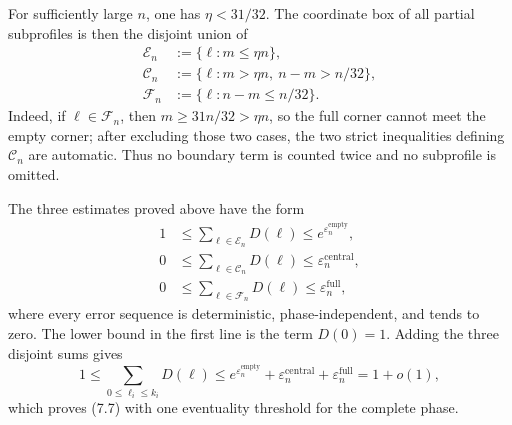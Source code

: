 
For sufficiently large $n$, one has $\eta<31/32$. The coordinate box of all
partial subprofiles is then the disjoint union of
\[
\begin{aligned}
  \mathcal E_n&:=\{\ell:m\le\eta n\},\\
  \mathcal C_n&:=\{\ell:m>\eta n,\ n-m>n/32\},\\
  \mathcal F_n&:=\{\ell:n-m\le n/32\}.
\end{aligned}
\]
Indeed, if $\ell\in\mathcal F_n$, then
$m\ge31n/32>\eta n$, so the full corner cannot meet the empty corner; after
excluding those two cases, the two strict inequalities defining
$\mathcal C_n$ are automatic. Thus no boundary term is counted twice and no
subprofile is omitted.

The three estimates proved above have the form
\[
\begin{aligned}
  1&\le\sum_{\ell\in\mathcal E_n}D(\ell)
      \le e^{\varepsilon_n^{\mathrm{empty}}},\\
  0&\le\sum_{\ell\in\mathcal C_n}D(\ell)
      \le\varepsilon_n^{\mathrm{central}},\\
  0&\le\sum_{\ell\in\mathcal F_n}D(\ell)
      \le\varepsilon_n^{\mathrm{full}},
\end{aligned}
\]
where every error sequence is deterministic, phase-independent, and tends to
zero. The lower bound in the first line is the term $D(0)=1$. Adding the three
disjoint sums gives
\[
  1
  \le
  \sum_{0\le\ell_i\le k_i}D(\ell)
  \le
  e^{\varepsilon_n^{\mathrm{empty}}}
  +\varepsilon_n^{\mathrm{central}}
  +\varepsilon_n^{\mathrm{full}}
  =1+o(1),
\]
which proves (7.7) with one eventuality threshold for the complete phase.
